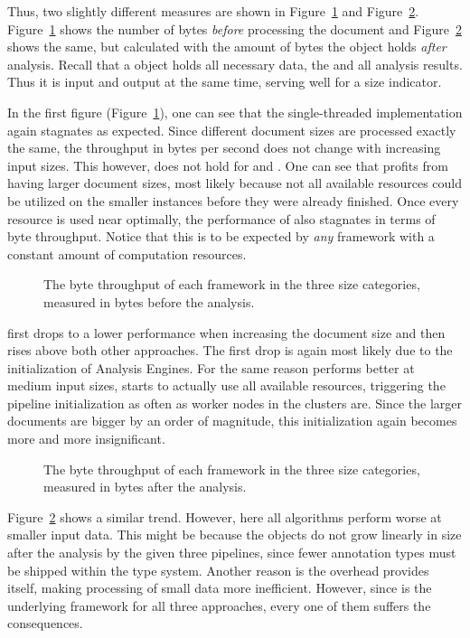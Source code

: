 Thus, two slightly different measures are shown in Figure~\ref{fig:result:throughput_bytes} and Figure~\ref{fig:result:throughput_bytes_after}. Figure~\ref{fig:result:throughput_bytes} shows the number of bytes \emph{before} processing the document and Figure~\ref{fig:result:throughput_bytes_after} shows the same, but calculated with the amount of bytes the \cas{} object holds \emph{after} analysis. Recall that a \cas{} object holds all necessary data, the \sofa{} and all analysis results. Thus it is input and output at the same time, serving well for a size indicator.

In the first figure (Figure~\ref{fig:result:throughput_bytes}), one can see that the single-threaded implementation again stagnates as expected. Since different document sizes are processed exactly the same, the throughput in bytes per second does not change with increasing input sizes. This however, does not hold for \uimaas{} and \spark{}. One can see that \uimaas{} profits from having larger document sizes, most likely because not all available resources could be utilized on the smaller instances before they were already finished. Once every resource is used near optimally, the performance of \uimaas{} also stagnates in terms of byte throughput. Notice that this is to be expected by \emph{any} framework with a constant amount of computation resources.
\begin{figure}[htb]
	\centering
	\resizebox{1.\linewidth}{!}{\small}
	\caption{The byte throughput of each framework in the three size categories, measured in bytes before the analysis.}
	\label{fig:result:throughput_bytes}
\end{figure}
\spark{} first drops to a lower performance when increasing the document size and then rises above both other approaches. The first drop is again most likely due to the initialization of Analysis Engines. For the same reason \uimaas{} performs better at medium input sizes, \spark{} starts to actually use all available resources, triggering the pipeline initialization as often as worker nodes in the \spark{} clusters are. Since the larger documents are bigger by an order of magnitude, this initialization again becomes more and more insignificant.
\begin{figure}[htb]
	\centering
	\resizebox{1.\linewidth}{!}{\small}
	\caption{The byte throughput of each framework in the three size categories, measured in bytes after the analysis.}
	\label{fig:result:throughput_bytes_after}
\end{figure}
Figure~\ref{fig:result:throughput_bytes_after} shows a similar trend. However, here all algorithms perform worse at smaller input data. This might be because the \cas{} objects do not grow linearly in size after the analysis by the given three pipelines, since fewer annotation types must be shipped within the type system. Another reason is the overhead \uima{} provides itself, making processing of small data more inefficient. However, since \uima{} is the underlying framework for all three approaches, every one of them suffers the consequences.




